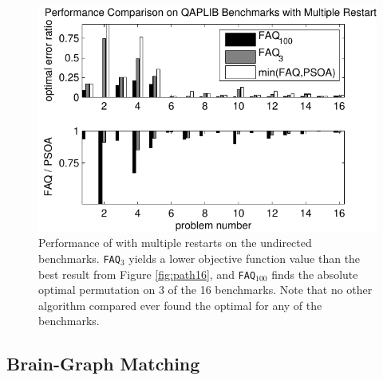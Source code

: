 \documentclass[10pt,journal,cspaper,compsoc]{IEEEtran}
\begin{document}
\begin{figure}[htbp]
	\centering
		\includegraphics[width=1.0\linewidth]{../figs/path16_restarts.pdf}
	\caption{Performance of \FAQ with multiple restarts on the undirected benchmarks. \texttt{FAQ}$_3$ yields a lower objective function value than the best result from Figure \ref{fig:path16}, and \texttt{FAQ}$_{100}$ finds the absolute optimal permutation on 3 of the 16 benchmarks.  Note that no other algorithm compared ever found the optimal for any of the benchmarks.}
	\label{fig:restarts}
\end{figure}



% 



\subsection{Brain-Graph Matching} %
\label{sub:connectome_classification}
\end{document}
